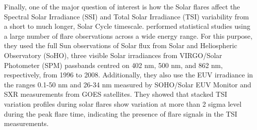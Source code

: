 \begin{table}[]
    \centering
    \caption{Spectral Energy Distribution from a sample of 2100 flares across various wavelengths\citep{kretzschmar11}.}
    \label{tab1}
\end{table}

Finally, one of the major question of interest is how the Solar flares affect the Spectral Solar Irradiance (SSI) and Total Solar Irradiance (TSI) variability from a short to much longer, Solar Cycle timescale. \cite{kretzschmar10,kretzschmar11} performed statistical studies using a large number of flare observations across a wide energy range. For this purpose, they used the full Sun observations of Solar flux from Solar and Heliospheric Observatory (SoHO), three visible Solar irradiances from VIRGO/Solar Photometer (SPM) passbands centred on 402 nm, 500 nm, and 862 nm, respectively, from 1996 to 2008. Additionally, they also use the EUV irradiance in the ranges 0.1-50 nm and 26-34 nm measured by SOHO/Solar EUV Monitor \citep{judge98} and SXR measurements from GOES satellites. They showed that stacked TSI variation profiles during solar flares show variation at more than 2 sigma level during the peak flare time, indicating the presence of flare signals in the TSI measurements.

